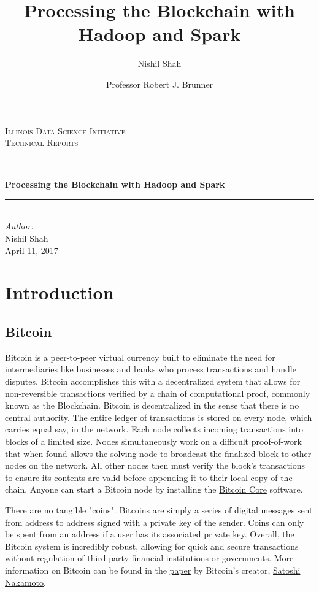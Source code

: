 \documentclass[9pt,twocolumn,twoside]{idsi}
\author[1,3]{Nishil Shah}
\author[2,3]{Professor Robert J. Brunner}
\affil[1]{National Center For Supercomputing Applications (NCSA)}
\affil[2]{Laboratory for Computation, Data, and Machine Learning}
\affil[3]{Illinois Data Science Initiative}
\title{Processing the Blockchain with Hadoop and Spark}
\newcommand{\HRule}{\rule{\linewidth}{0.5mm}}
\begin{document}
\begin{titlepage}
\center
\textsc{\LARGE Illinois Data Science Initiative}\\[1.5cm]
\textsc{\Large Technical Reports}\\[0.5cm] \HRule \\[0.4cm]
{\huge \bfseries Processing the Blockchain with Hadoop and Spark } \\[0.4cm] \HRule \\[1.5cm]
\Large \emph{Author:}\\ Nishil Shah \\[3cm]
{\large April 11, 2017}\\[3cm] %
\vfill
\end{titlepage}
%

\maketitle

\section{Introduction}
\subsection{Bitcoin}
Bitcoin is a peer-to-peer virtual currency built to eliminate the need for intermediaries like businesses and banks who process transactions and handle disputes. Bitcoin accomplishes this with a decentralized system that allows for non-reversible transactions verified by a chain of computational proof, commonly known as the Blockchain. Bitcoin is decentralized in the sense that there is no central authority. The entire ledger of transactions is stored on every node, which carries equal say, in the network. Each node collects incoming transactions into blocks of a limited size. Nodes simultaneously work on a difficult proof-of-work that when found allows the solving node to broadcast the finalized block to other nodes on the network. All other nodes then must verify the block's transactions to ensure its contents are valid before appending it to their local copy of the chain. Anyone can start a Bitcoin node by installing the \href{https://bitcoin.org/en/bitcoin-core/}{Bitcoin Core} software.

There are no tangible "coins". Bitcoins are simply a series of digital messages sent from address to address signed with a private key of the sender. Coins can only be spent from an address if a user has its associated private key. Overall, the Bitcoin system is incredibly robust, allowing for quick and secure transactions without regulation of third-party financial institutions or governments. More information on Bitcoin can be found in the \href{https://bitcoin.org/bitcoin.pdf}{paper} by Bitcoin's creator, \href{https://en.wikipedia.org/wiki/Satoshi_Nakamoto}{Satoshi Nakamoto}.
\end{document}
